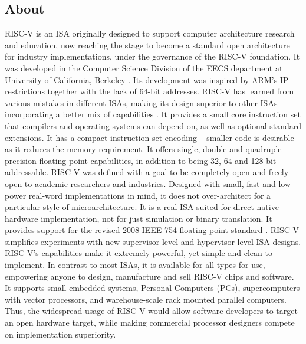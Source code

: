 \subsection{About}
 \label{sect6_1_1}
RISC-V is an ISA originally designed to support computer architecture research and education, now reaching the stage to become a standard open architecture for industry implementations, under the governance of the RISC-V foundation. It was developed in the Computer Science Division of the EECS department at University of California, Berkeley \cite{riscv_home}. Its development was inspired by ARM's IP restrictions together with the lack of 64-bit addresses. \newline\newline
RISC-V has learned from various mistakes in different ISAs, making its design superior to other ISAs incorporating a better mix of capabilities \cite{riscv_isa_free}. It provides a small core instruction set that compilers and operating systems can depend on, as well as optional standard extensions. It has a compact instruction set encoding – smaller code is desirable as it reduces the memory requirement. It offers single, double and quadruple precision floating point capabilities, in addition to being 32, 64 and 128-bit addressable. \newline\newline
RISC-V was defined with a goal to be completely open and freely open to academic researchers and industries. Designed with small, fast and low-power real-word implementations in mind, it does not over-architect for a particular style of microarchitecture. It is a real ISA suited for direct native hardware implementation, not for just simulation or binary translation. It provides support for the revised 2008 IEEE-754 floating-point standard \cite{ieee_754}. RISC-V simplifies experiments with new supervisor-level and hypervisor-level ISA designs. \newline\newline
RISC-V's capabilities make it extremely powerful, yet simple and clean to implement. In contrast to most ISAs, it is available for all types for use, empowering anyone to design, manufacture and sell RISC-V chips and software. It supports small embedded systems, Personal Computers (PCs), supercomputers with vector processors, and warehouse-scale rack mounted parallel computers. Thus, the widespread usage of RISC-V would allow software developers to target an open hardware target, while making commercial processor designers compete on implementation superiority. 

